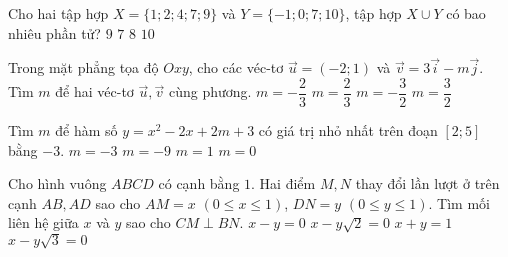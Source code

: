 \begin{ex}%
        Cho hai tập hợp $X=\{1;2;4;7;9\}$ và $Y=\{-1;0;7;10\}$, tập hợp $X\cup Y$ có bao nhiêu phần tử?
        \choice        
        {$9$}
        {$7$}
        {\True $8$}
        {$10$}
\end{ex}
\begin{ex}%
        Trong mặt phẳng tọa độ $Oxy$, cho các véc-tơ $\vec{u}=(-2;1)$ và $\vec{v}=3\vec{i}-m\vec{j}$. Tìm $m$ để hai véc-tơ $\vec{u}, \vec{v}$ cùng phương.
        \choice        
        {$m=-\dfrac{2}{3}$}
        {$m=\dfrac{2}{3}$}
        {$m=-\dfrac{3}{2}$}
        {\True $m=\dfrac{3}{2}$}
\end{ex}
\begin{ex}%
        Tìm $m$ để hàm số $y=x^2-2x+2m+3$ có giá trị nhỏ nhất trên đoạn $[2;5]$ bằng $-3$.
        \choice        
        {\True $m=-3$}
        {$m=-9$}
        {$m=1$}
        {$m=0$}
\end{ex}
\begin{ex}%
        Cho hình vuông $ABCD$ có cạnh bằng $1$. Hai điểm $M, N$ thay đổi lần lượt ở trên cạnh $AB, AD$ sao cho $AM = x$ $ (0\le x \le 1)$, $DN = y$ $(0\le y \le 1)$. Tìm mối liên hệ giữa $x$ và $y$ sao cho $CM\perp BN$.
        \choice        
        {$x-y=0$}
        {$x-y\sqrt{2}=0$}
        {\True $x+y=1$}
        {$x-y\sqrt{3}=0$}
\end{ex}
